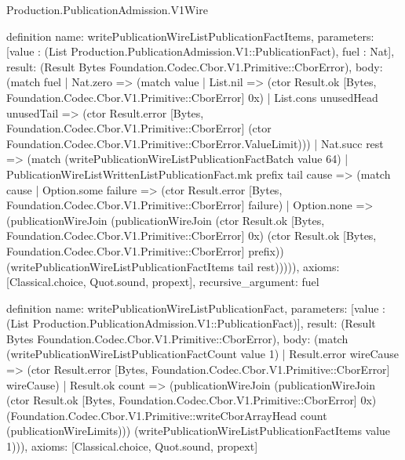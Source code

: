 \begin{lexlean}{Production.PublicationAdmission.V1Wire}
\begin{semanticmodule}
definition{
  name: writePublicationWireListPublicationFactItems,
  parameters: [value : (List Production.PublicationAdmission.V1::PublicationFact), fuel : Nat],
  result: (Result Bytes Foundation.Codec.Cbor.V1.Primitive::CborError),
  body: (match fuel
    | Nat.zero => (match value
      | List.nil => (ctor Result.ok [Bytes, Foundation.Codec.Cbor.V1.Primitive::CborError] 0x)
      | List.cons unusedHead unusedTail => (ctor Result.error [Bytes, Foundation.Codec.Cbor.V1.Primitive::CborError] (ctor Foundation.Codec.Cbor.V1.Primitive::CborError.ValueLimit)))
    | Nat.succ rest => (match (writePublicationWireListPublicationFactBatch value 64)
      | PublicationWireListWrittenListPublicationFact.mk prefix tail cause => (match cause
        | Option.some failure => (ctor Result.error [Bytes, Foundation.Codec.Cbor.V1.Primitive::CborError] failure)
        | Option.none => (publicationWireJoin (publicationWireJoin (ctor Result.ok [Bytes, Foundation.Codec.Cbor.V1.Primitive::CborError] 0x) (ctor Result.ok [Bytes, Foundation.Codec.Cbor.V1.Primitive::CborError] prefix)) (writePublicationWireListPublicationFactItems tail rest))))),
  axioms: [Classical.choice, Quot.sound, propext],
  recursive_argument: fuel
}

definition{
  name: writePublicationWireListPublicationFact,
  parameters: [value : (List Production.PublicationAdmission.V1::PublicationFact)],
  result: (Result Bytes Foundation.Codec.Cbor.V1.Primitive::CborError),
  body: (match (writePublicationWireListPublicationFactCount value 1)
    | Result.error wireCause => (ctor Result.error [Bytes, Foundation.Codec.Cbor.V1.Primitive::CborError] wireCause)
    | Result.ok count => (publicationWireJoin (publicationWireJoin (ctor Result.ok [Bytes, Foundation.Codec.Cbor.V1.Primitive::CborError] 0x) (Foundation.Codec.Cbor.V1.Primitive::writeCborArrayHead count (publicationWireLimits))) (writePublicationWireListPublicationFactItems value 1))),
  axioms: [Classical.choice, Quot.sound, propext]
}


\end{semanticmodule}
\end{lexlean}
